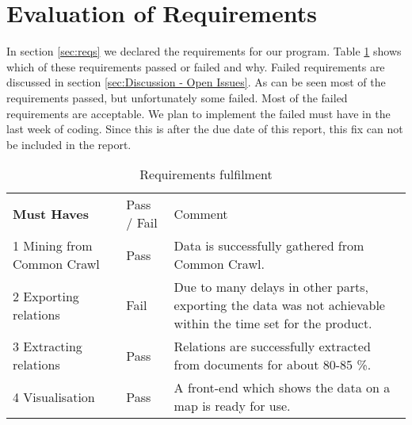 \section{Evaluation of Requirements}
In section \ref{sec:reqs} we declared the requirements for our program. Table \ref{requirements_pass/fail} shows which of these requirements passed or failed and why. Failed requirements are discussed in section \ref{sec:Discussion - Open Issues}. As can be seen most of the requirements passed, but unfortunately some failed. Most of the failed requirements are acceptable. We plan to implement the failed must have in the last week of coding. Since this is after the due date of this report, this fix can not be included in the report.\\

\begin{table}[H]
\centering
\caption{Requirements fulfilment}
\label{requirements_pass/fail}
\begin{tabular}{ll m{8cm}}
\textbf{Must Haves}                     & Pass / Fail & Comment                                                                                                                                                                                                                           \\
1 Mining from Common Crawl     & Pass        & Data is successfully gathered from Common Crawl.                                                                                                                                                                                       \\ \hline
2 Exporting relations          & Fail        & Due to many delays in other parts, exporting the data was not achievable within the time set for the product.                                                                                                                         \\ \hline
3 Extracting relations         & Pass        & Relations are successfully extracted from documents for about 80-85 \%.                                                                                                                                                            \\ \hline
4 Visualisation                & Pass        & A front-end which shows the data on a map is ready for use.                                                                                                                                                                           \\ \hline

\end{tabular}
\end{table}
